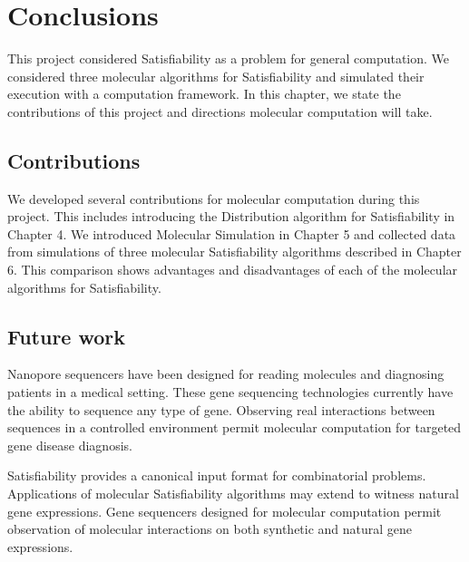 \chapter{Conclusions}

This project considered {\sc Satisfiability} as a problem for general computation.  We considered three molecular algorithms for {\sc Satisfiability} and simulated their execution with a computation framework.  In this chapter, we state the contributions of this project and directions molecular computation will take.
	
	\section{Contributions}

We developed several contributions for molecular computation during this project.  This includes introducing the Distribution algorithm for {\sc Satisfiability} in Chapter 4.  We introduced Molecular Simulation in Chapter 5 and collected data from simulations of three molecular {\sc Satisfiability} algorithms described in Chapter 6.  This comparison shows advantages and disadvantages of each of the molecular algorithms for {\sc Satisfiability}.


	\section{Future work}
	
Nanopore sequencers have been designed for reading molecules and diagnosing patients in a medical setting.  These gene sequencing technologies currently have the ability to sequence any type of gene.  Observing real interactions between sequences in a controlled environment permit molecular computation for targeted gene disease diagnosis.

{\sc Satisfiability} provides a canonical input format for combinatorial problems.  Applications of molecular {\sc Satisfiability} algorithms may extend to witness natural gene expressions.  Gene sequencers designed for molecular computation permit observation of molecular interactions on both synthetic and natural gene expressions. 


